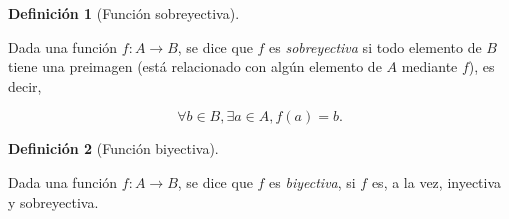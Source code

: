 \documentclass[
  a4paper,
]{scrreport}
\theoremstyle{definition}
\newtheorem{definition}{Definición}[chapter]
\theoremstyle{plain}
\theoremstyle{plain}
\theoremstyle{definition}
\theoremstyle{definition}
\theoremstyle{plain}
\theoremstyle{remark}
\begin{document}
\begin{definition}[Función
sobreyectiva]\protect\hypertarget{def-funcion-sobreyectiva}{}\label{def-funcion-sobreyectiva}

Dada una función \(f:A\rightarrow B\), se dice que \(f\) es
\emph{sobreyectiva} si todo elemento de \(B\) tiene una preimagen (está
relacionado con algún elemento de \(A\) mediante \(f\)), es decir,

\[\forall b \in B, \exists a\in A, f(a) = b.\]

\end{definition}

\begin{definition}[Función
biyectiva]\protect\hypertarget{def-funcion-biyectiva}{}\label{def-funcion-biyectiva}

Dada una función \(f:A\rightarrow B\), se dice que \(f\) es
\emph{biyectiva}, si \(f\) es, a la vez, inyectiva y sobreyectiva.

\end{definition}
\end{document}

